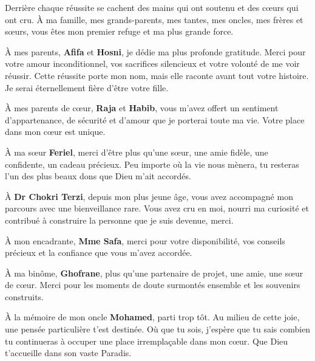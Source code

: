 \thispagestyle{empty}
\begin{center}
\itshape

Derrière chaque réussite se cachent des mains qui ont soutenu et des cœurs qui ont cru. À ma famille, mes grands-parents, mes tantes, mes oncles, mes frères et sœurs, vous êtes mon premier refuge et ma plus grande force. 

\vspace{0.3cm}

À mes parents, \textbf{Afifa} et \textbf{Hosni}, je dédie ma plus profonde gratitude. Merci pour votre amour inconditionnel, vos sacrifices silencieux et votre volonté de me voir réussir. Cette réussite porte mon nom, mais elle raconte avant tout votre histoire. Je serai éternellement fière d’être votre fille.

\vspace{0.3cm}

À mes parents de cœur, \textbf{Raja} et \textbf{Habib}, vous m’avez offert un sentiment d’appartenance, de sécurité et d’amour que je porterai toute ma vie. Votre place dans mon cœur est unique.

\vspace{0.3cm}

À ma sœur \textbf{Feriel}, merci d'être plus qu’une sœur, une amie fidèle, une confidente, un cadeau précieux. Peu importe où la vie nous mènera, tu resteras l’un des plus beaux dons que Dieu m’ait accordés.

\vspace{0.3cm}

À \textbf{Dr Chokri Terzi}, depuis mon plus jeune âge, vous avez accompagné mon parcours avec une bienveillance rare. Vous avez cru en moi, nourri ma curiosité et contribué à construire la personne que je suis devenue, merci.

\vspace{0.3cm}

À mon encadrante, \textbf{Mme Safa}, merci pour votre disponibilité, vos conseils précieux et la confiance que vous m’avez accordée.

\vspace{0.3cm}

À ma binôme, \textbf{Ghofrane}, plus qu’une partenaire de projet, une amie, une sœur de cœur. Merci pour les moments de doute surmontés ensemble et les souvenirs construits.

\vspace{0.3cm}

À la mémoire de mon oncle \textbf{Mohamed}, parti trop tôt. Au milieu de cette joie, une pensée particulière t’est destinée. Où que tu sois, j’espère que tu sais combien tu continueras à occuper une place irremplaçable dans mon cœur. Que Dieu t’accueille dans son vaste Paradis.


\end{center}
